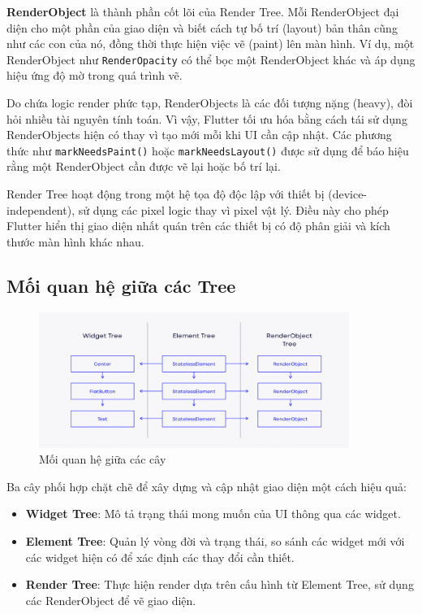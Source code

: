 \documentclass[../DoAn.tex]{subfiles}
\numberwithin{figure}{chapter}
\begin{document}
\textbf{RenderObject} là thành phần cốt lõi của Render Tree. Mỗi RenderObject đại diện cho một phần của giao diện và biết cách tự bố trí (layout) bản thân cũng như các con của nó, đồng thời thực hiện việc vẽ (paint) lên màn hình. Ví dụ, một RenderObject như \texttt{RenderOpacity} có thể bọc một RenderObject khác và áp dụng hiệu ứng độ mờ trong quá trình vẽ.

Do chứa logic render phức tạp, RenderObjects là các đối tượng nặng (heavy), đòi hỏi nhiều tài nguyên tính toán. Vì vậy, Flutter tối ưu hóa bằng cách tái sử dụng RenderObjects hiện có thay vì tạo mới mỗi khi UI cần cập nhật. Các phương thức như \texttt{markNeedsPaint()} hoặc \texttt{markNeedsLayout()} được sử dụng để báo hiệu rằng một RenderObject cần được vẽ lại hoặc bố trí lại.

Render Tree hoạt động trong một hệ tọa độ độc lập với thiết bị (device-independent), sử dụng các pixel logic thay vì pixel vật lý. Điều này cho phép Flutter hiển thị giao diện nhất quán trên các thiết bị có độ phân giải và kích thước màn hình khác nhau.

\subsection{Mối quan hệ giữa các Tree}

\begin{figure}[H]
    \centering
    \includegraphics[width=0.9\textwidth]{Hinhve/Chuong5/3trees.png}
    \caption{Mối quan hệ giữa các cây}
    \label{fig:3trees}
\end{figure}

Ba cây phối hợp chặt chẽ để xây dựng và cập nhật giao diện một cách hiệu quả:
\begin{itemize}
    \item \textbf{Widget Tree}: Mô tả trạng thái mong muốn của UI thông qua các widget.
    \item \textbf{Element Tree}: Quản lý vòng đời và trạng thái, so sánh các widget mới với các widget hiện có để xác định các thay đổi cần thiết.
    \item \textbf{Render Tree}: Thực hiện render dựa trên cấu hình từ Element Tree, sử dụng các RenderObject để vẽ giao diện.
\end{itemize}
\end{document}
